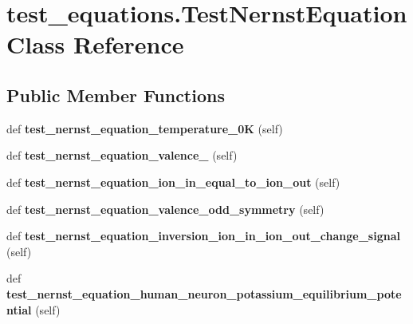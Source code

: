 \hypertarget{classtest__equations_1_1TestNernstEquation}{}\section{test\+\_\+equations.\+Test\+Nernst\+Equation Class Reference}
\label{classtest__equations_1_1TestNernstEquation}
\subsection*{Public Member Functions}
\begin{DoxyCompactItemize}
\item 
\mbox{\label{classtest__equations_1_1TestNernstEquation_a82274772418b76d1a300350a69818f21}} 
def {\bfseries test\+\_\+nernst\+\_\+equation\+\_\+temperature\+\_\+0K} (self)
\item 
\mbox{\label{classtest__equations_1_1TestNernstEquation_af4229facc578cdecc3985fab7b11e066}} 
def {\bfseries test\+\_\+nernst\+\_\+equation\+\_\+valence\+\_} (self)
\item 
\mbox{\label{classtest__equations_1_1TestNernstEquation_aa1bf61daf373f35e60f7bd99ddf2d075}} 
def {\bfseries test\+\_\+nernst\+\_\+equation\+\_\+ion\+\_\+in\+\_\+equal\+\_\+to\+\_\+ion\+\_\+out} (self)
\item 
\mbox{\label{classtest__equations_1_1TestNernstEquation_a15466595033269e70a0bc4d33878a62d}} 
def {\bfseries test\+\_\+nernst\+\_\+equation\+\_\+valence\+\_\+odd\+\_\+symmetry} (self)
\item 
\mbox{\label{classtest__equations_1_1TestNernstEquation_a16ad8b73df7f89383e7918ac822692a1}} 
def {\bfseries test\+\_\+nernst\+\_\+equation\+\_\+inversion\+\_\+ion\+\_\+in\+\_\+ion\+\_\+out\+\_\+change\+\_\+signal} (self)
\item 
\mbox{\label{classtest__equations_1_1TestNernstEquation_a3f22e91377df2676973f46b4294d7ca9}} 
def {\bfseries test\+\_\+nernst\+\_\+equation\+\_\+human\+\_\+neuron\+\_\+potassium\+\_\+equilibrium\+\_\+potential} (self)

\end{DoxyCompactItemize}
